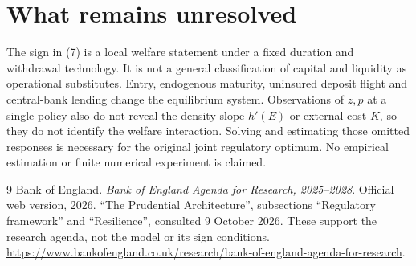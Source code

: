 \documentclass[11pt]{article}
\theoremstyle{remark}
\begin{document}
\section{What remains unresolved}
The sign in (7) is a local welfare statement under a fixed duration and
withdrawal technology. It is not a general classification of capital and
liquidity as operational substitutes. Entry, endogenous maturity, uninsured
deposit flight and central-bank lending change the equilibrium system.
Observations of $z,p$ at a single policy also do not reveal the density
slope $h'(E)$ or external cost $K$, so they do not identify the welfare
interaction. Solving and estimating those omitted responses is necessary
for the original joint regulatory optimum. No empirical estimation or
finite numerical experiment is claimed.

\begin{thebibliography}{9}
 Bank of England. \emph{Bank of England Agenda for Research,
2025--2028}. Official web version, 2026.
``The Prudential Architecture'', subsections ``Regulatory framework'' and
``Resilience'', consulted 9 October 2026. These support the research
agenda, not the model or its sign conditions.
\url{https://www.bankofengland.co.uk/research/bank-of-england-agenda-for-research}.
\end{thebibliography}
\end{document}
